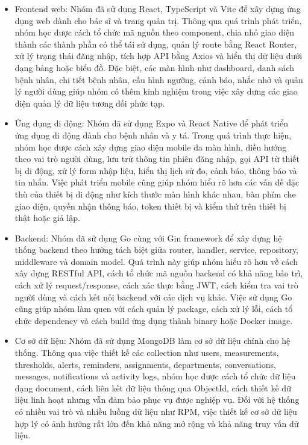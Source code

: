 \begin{itemize}
    \item Frontend web: Nhóm đã sử dụng React, TypeScript và Vite để xây dựng ứng dụng web dành cho bác sĩ và trang quản trị. Thông qua quá trình phát triển, nhóm học được cách tổ chức mã nguồn theo component, chia nhỏ giao diện thành các thành phần có thể tái sử dụng, quản lý route bằng React Router, xử lý trạng thái đăng nhập, tích hợp API bằng Axios và hiển thị dữ liệu dưới dạng bảng hoặc biểu đồ. Đặc biệt, các màn hình như dashboard, danh sách bệnh nhân, chi tiết bệnh nhân, cấu hình ngưỡng, cảnh báo, nhắc nhở và quản lý người dùng giúp nhóm có thêm kinh nghiệm trong việc xây dựng các giao diện quản lý dữ liệu tương đối phức tạp.

    \item Ứng dụng di động: Nhóm đã sử dụng Expo và React Native để phát triển ứng dụng di động dành cho bệnh nhân và y tá. Trong quá trình thực hiện, nhóm học được cách xây dựng giao diện mobile đa màn hình, điều hướng theo vai trò người dùng, lưu trữ thông tin phiên đăng nhập, gọi API từ thiết bị di động, xử lý form nhập liệu, hiển thị lịch sử đo, cảnh báo, thông báo và tin nhắn. Việc phát triển mobile cũng giúp nhóm hiểu rõ hơn các vấn đề đặc thù của thiết bị di động như kích thước màn hình khác nhau, bàn phím che giao diện, quyền nhận thông báo, token thiết bị và kiểm thử trên thiết bị thật hoặc giả lập.

    \item Backend: Nhóm đã sử dụng Go cùng với Gin framework để xây dựng hệ thống backend theo hướng tách biệt giữa router, handler, service, repository, middleware và domain model. Quá trình này giúp nhóm hiểu rõ hơn về cách xây dựng RESTful API, cách tổ chức mã nguồn backend có khả năng bảo trì, cách xử lý request/response, cách xác thực bằng JWT, cách kiểm tra vai trò người dùng và cách kết nối backend với các dịch vụ khác. Việc sử dụng Go cũng giúp nhóm làm quen với cách quản lý package, cách xử lý lỗi, cách tổ chức dependency và cách build ứng dụng thành binary hoặc Docker image.

    \item Cơ sở dữ liệu: Nhóm đã sử dụng MongoDB làm cơ sở dữ liệu chính cho hệ thống. Thông qua việc thiết kế các collection như users, measurements, thresholds, alerts, reminders, assignments, departments, conversations, messages, notifications và activity logs, nhóm học được cách tổ chức dữ liệu dạng document, cách liên kết dữ liệu thông qua ObjectId, cách thiết kế dữ liệu linh hoạt nhưng vẫn đảm bảo phục vụ được nghiệp vụ. Đối với hệ thống có nhiều vai trò và nhiều luồng dữ liệu như RPM, việc thiết kế cơ sở dữ liệu hợp lý có ảnh hưởng rất lớn đến khả năng mở rộng và khả năng truy vấn dữ liệu.


\end{itemize}
